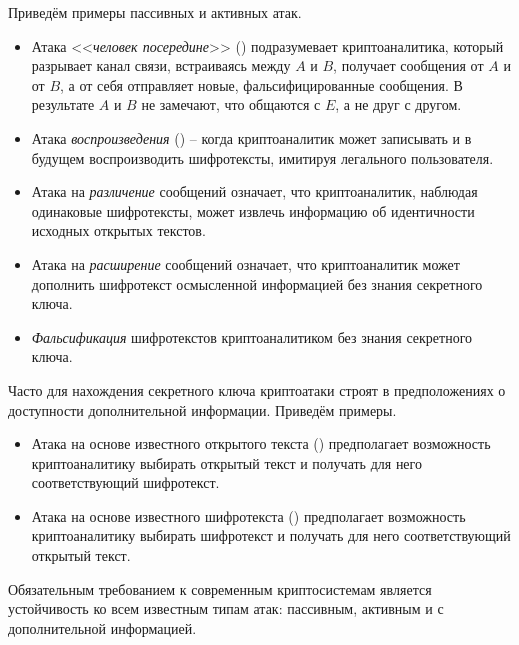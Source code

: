 Приведём примеры пассивных и активных атак.
\begin{itemize}
    \item Атака <<\emph{человек посередине}>> () подразумевает криптоаналитика, который разрывает канал связи, встраиваясь между $A$ и $B$, получает сообщения от $A$ и от $B$, а от себя отправляет новые, фальсифицированные сообщения. В результате $A$ и $B$ не замечают, что общаются с $E$, а не друг с другом.
    \item Атака \emph{воспроизведения} () -- когда криптоаналитик может записывать и в будущем воспроизводить шифротексты, имитируя легального пользователя.
    \item Атака на \emph{различение} сообщений означает, что криптоаналитик, наблюдая одинаковые шифротексты, может извлечь информацию об идентичности исходных открытых текстов.
    \item Атака на \emph{расширение} сообщений означает, что криптоаналитик может дополнить шифротекст осмысленной информацией без знания секретного ключа.
    \item \emph{Фальсификация} шифротекстов криптоаналитиком без знания секретного ключа.
\end{itemize}

Часто для нахождения секретного ключа криптоатаки строят в предположениях о доступности дополнительной информации. Приведём примеры.
\begin{itemize}
    \item Атака на основе известного открытого текста () предполагает возможность криптоаналитику выбирать открытый текст и получать для него соответствующий шифротекст.
    \item Атака на основе известного шифротекста () предполагает возможность криптоаналитику выбирать шифротекст и получать для него соответствующий открытый текст.
\end{itemize}

Обязательным требованием к современным криптосистемам является устойчивость ко всем известным типам атак: пассивным, активным и с дополнительной информацией.


%

